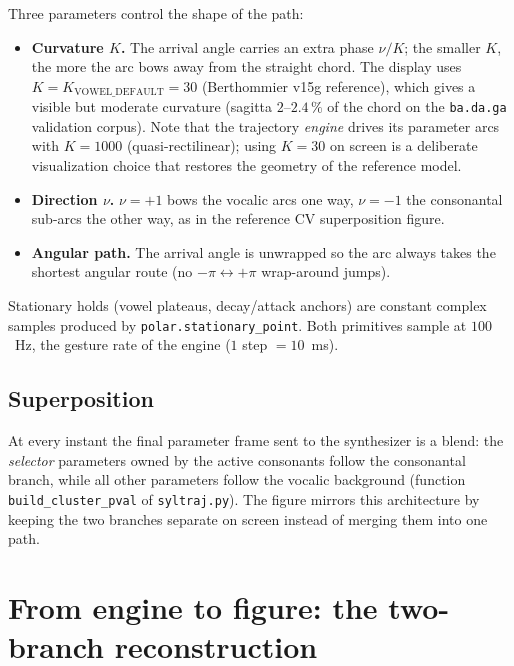 \documentclass[11pt,a4paper]{article}
\newcommand{\code}[1]{\texttt{#1}}
\begin{document}
Three parameters control the shape of the path:

\begin{itemize}[leftmargin=1.4em]
\item \textbf{Curvature $K$.} The arrival angle carries an extra
      phase $\nu/K$; the smaller $K$, the more the arc bows away from
      the straight chord. The display uses
      $K = K_{\text{VOWEL\_DEFAULT}} = 30$ (Berthommier v15g
      reference), which gives a visible but moderate curvature
      (sagitta $2$--$2.4\,\%$ of the chord on the \code{ba.da.ga}
      validation corpus). Note that the trajectory \emph{engine}
      drives its parameter arcs with $K = 1000$ (quasi-rectilinear);
      using $K=30$ on screen is a deliberate visualization choice
      that restores the geometry of the reference model.
\item \textbf{Direction $\nu$.} $\nu = +1$ bows the vocalic arcs one
      way, $\nu = -1$ the consonantal sub-arcs the other way, as in
      the reference CV superposition figure.
\item \textbf{Angular path.} The arrival angle is unwrapped so the
      arc always takes the shortest angular route (no
      $-\pi \leftrightarrow +\pi$ wrap-around jumps).
\end{itemize}

Stationary holds (vowel plateaus, decay/attack anchors) are constant
complex samples produced by \code{polar.stationary\_point}. Both
primitives sample at $100$~Hz, the gesture rate of the engine
($1$ step $= 10$~ms).

\subsection{Superposition}

At every instant the final parameter frame sent to the synthesizer is
a blend: the \emph{selector} parameters owned by the active
consonants follow the consonantal branch, while all other parameters
follow the vocalic background (function
\code{build\_cluster\_pval} of \code{syltraj.py}). The figure
mirrors this architecture by keeping the two branches separate on
screen instead of merging them into one path.

\section{From engine to figure: the two-branch reconstruction}
\label{sec:reconstruction}
\end{document}
